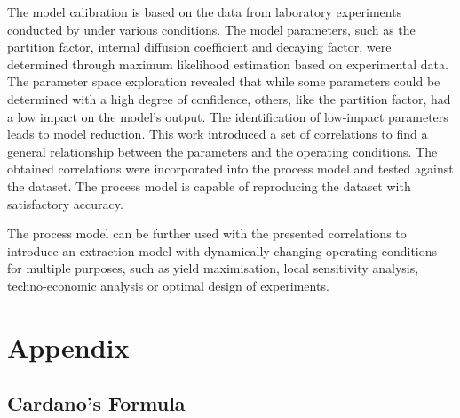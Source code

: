 \documentclass[a4paper,fleqn]{cas-dc}
\begin{document}
The model calibration is based on the data from laboratory experiments conducted by \citet{Povh2001} under various conditions. The model parameters, such as the partition factor, internal diffusion coefficient and decaying factor, were determined through maximum likelihood estimation based on experimental data. The parameter space exploration revealed that while some parameters could be determined with a high degree of confidence, others, like the partition factor, had a low impact on the model's output. The identification of low-impact parameters leads to model reduction. This work introduced a set of correlations to find a general relationship between the parameters and the operating conditions. The obtained correlations were incorporated into the process model and tested against the dataset. The process model is capable of reproducing the dataset with satisfactory accuracy.

The process model can be further used with the presented correlations to introduce an extraction model with dynamically changing operating conditions for multiple purposes, such as yield maximisation, local sensitivity analysis, techno-economic analysis or optimal design of experiments.

\newpage
%



\clearpage \appendix \label{appendix}
\section{Appendix} 

 \label{CH: EOS}

\subsection{Cardano's Formula} \label{CH: Cardano}

\end{document}
